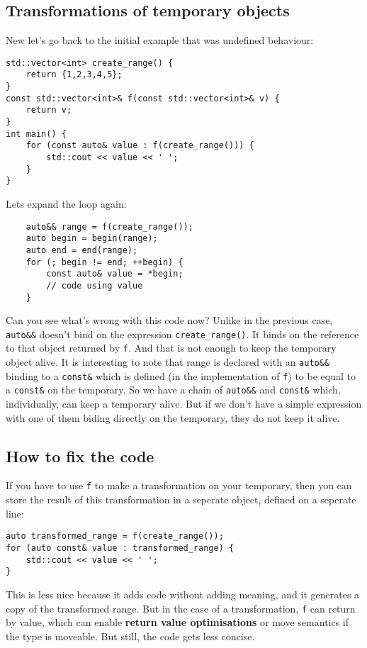 \documentclass{report}
\begin{document}
\subsection{Transformations of temporary objects}
New let's go back to the initial example that was undefined behaviour:
\begin{verbatim}
std::vector<int> create_range() {
    return {1,2,3,4,5};
}
const std::vector<int>& f(const std::vector<int>& v) {
    return v;
}
int main() {
    for (const auto& value : f(create_range())) {
        std::cout << value << ' '; 
    }
}
\end{verbatim}
Lets expand the loop again:
\begin{verbatim}
    auto&& range = f(create_range());
    auto begin = begin(range);
    auto end = end(range);
    for (; begin != end; ++begin) {
        const auto& value = *begin;
        // code using value
    }
\end{verbatim}
Can you see what's wrong with this code now?
\bigbreak \noindent
Unlike in the previous case, \texttt{auto\&\&} doesn't bind on the expression \texttt{create\_range()}. It binds on the reference to that object returned by \texttt{f}. And that is not enough to keep the temporary object alive.
\bigbreak \noindent
It is interesting to note that range is declared with an \texttt{auto\&\&} binding to a \texttt{const\&} which is defined (in the implementation of \texttt{f}) to be equal to a \texttt{const\&} on the temporary. So we have a chain of \texttt{auto\&\&} and \texttt{const\&} which, individually, can keep a temporary alive. But if we don't have a simple expression with one of them biding directly on the temporary, they do not keep it alive.
\bigbreak \noindent
\subsection{How to fix the code}
If you have to use \texttt{f} to make a transformation on your temporary, then you can store the result of this transformation in a seperate object, defined on a seperate line:
\begin{verbatim}
auto transformed_range = f(create_range());
for (auto const& value : transformed_range) {
    std::cout << value << ' ';
}
\end{verbatim}
This is less nice because it adds code without adding meaning, and it generates a copy of the transformed range. But in the case of a transformation, \texttt{f} can return by value, which can enable \textbf{return value optimisations} or move semantics if the type is moveable. But still, the code gets less concise.
\end{document}
